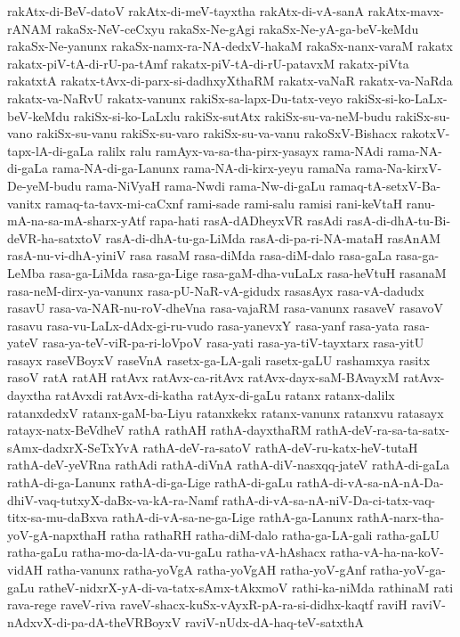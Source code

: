 {rakAtx-di-BeV-datoV
rakAtx-di-meV-tayxtha
rakAtx-di-vA-sanA
rakAtx-mavx-rANAM
rakaSx-NeV-ceCxyu
rakaSx-Ne-gAgi
rakaSx-Ne-yA-ga-beV-keMdu
rakaSx-Ne-yanunx
rakaSx-namx-ra-NA-dedxV-hakaM
rakaSx-nanx-varaM
rakatx
rakatx-piV-tA-di-rU-pa-tAmf
rakatx-piV-tA-di-rU-patavxM
rakatx-piVta
rakatxtA
rakatx-tAvx-di-parx-si-dadhxyXthaRM
rakatx-vaNaR
rakatx-va-NaRda
rakatx-va-NaRvU
rakatx-vanunx
rakiSx-sa-lapx-Du-tatx-veyo
rakiSx-si-ko-LaLx-beV-keMdu
rakiSx-si-ko-LaLxlu
rakiSx-sutAtx
rakiSx-su-va-neM-budu
rakiSx-su-vano
rakiSx-su-vanu
rakiSx-su-varo
rakiSx-su-va-vanu
rakoSxV-Bishacx
rakotxV-tapx-lA-di-gaLa
ralilx
ralu
ramAyx-va-sa-tha-pirx-yasayx
rama-NAdi
rama-NA-di-gaLa
rama-NA-di-ga-Lanunx
rama-NA-di-kirx-yeyu
ramaNa
rama-Na-kirxV-De-yeM-budu
rama-NiVyaH
rama-Nwdi
rama-Nw-di-gaLu
ramaq-tA-setxV-Ba-vanitx
ramaq-ta-tavx-mi-caCxnf
rami-sade
rami-salu
ramisi
rani-keVtaH
ranu-mA-na-sa-mA-sharx-yAtf
rapa-hati
rasA-dADheyxVR
rasAdi
rasA-di-dhA-tu-Bi-deVR-ha-satxtoV
rasA-di-dhA-tu-ga-LiMda
rasA-di-pa-ri-NA-mataH
rasAnAM
rasA-nu-vi-dhA-yiniV
rasa
rasaM
rasa-diMda
rasa-diM-dalo
rasa-gaLa
rasa-ga-LeMba
rasa-ga-LiMda
rasa-ga-Lige
rasa-gaM-dha-vuLaLx
rasa-heVtuH
rasanaM
rasa-neM-dirx-ya-vanunx
rasa-pU-NaR-vA-gidudx
rasasAyx
rasa-vA-dadudx
rasavU
rasa-va-NAR-nu-roV-dheVna
rasa-vajaRM
rasa-vanunx
rasaveV
rasavoV
rasavu
rasa-vu-LaLx-dAdx-gi-ru-vudo
rasa-yanevxY
rasa-yanf
rasa-yata
rasa-yateV
rasa-ya-teV-viR-pa-ri-loVpoV
rasa-yati
rasa-ya-tiV-tayxtarx
rasa-yitU
rasayx
raseVBoyxV
raseVnA
rasetx-ga-LA-gali
rasetx-gaLU
rashamxya
rasitx
rasoV
ratA
ratAH
ratAvx
ratAvx-ca-ritAvx
ratAvx-dayx-saM-BAvayxM
ratAvx-dayxtha
ratAvxdi
ratAvx-di-katha
ratAyx-di-gaLu
ratanx
ratanx-dalilx
ratanxdedxV
ratanx-gaM-ba-Liyu
ratanxkekx
ratanx-vanunx
ratanxvu
ratasayx
ratayx-natx-BeVdheV
rathA
rathAH
rathA-dayxthaRM
rathA-deV-ra-sa-ta-satx-sAmx-dadxrX-SeTxYvA
rathA-deV-ra-satoV
rathA-deV-ru-katx-heV-tutaH
rathA-deV-yeVRna
rathAdi
rathA-diVnA
rathA-diV-nasxqq-jateV
rathA-di-gaLa
rathA-di-ga-Lanunx
rathA-di-ga-Lige
rathA-di-gaLu
rathA-di-vA-sa-nA-nA-Da-dhiV-vaq-tutxyX-daBx-va-kA-ra-Namf
rathA-di-vA-sa-nA-niV-Da-ci-tatx-vaq-titx-sa-mu-daBxva
rathA-di-vA-sa-ne-ga-Lige
rathA-ga-Lanunx
rathA-narx-tha-yoV-gA-napxthaH
ratha
rathaRH
ratha-diM-dalo
ratha-ga-LA-gali
ratha-gaLU
ratha-gaLu
ratha-mo-da-lA-da-vu-gaLu
ratha-vA-hAshacx
ratha-vA-ha-na-koV-vidAH
ratha-vanunx
ratha-yoVgA
ratha-yoVgAH
ratha-yoV-gAnf
ratha-yoV-ga-gaLu
ratheV-nidxrX-yA-di-va-tatx-sAmx-tAkxmoV
rathi-ka-niMda
rathinaM
rati
rava-rege
raveV-riva
raveV-shacx-kuSx-vAyxR-pA-ra-si-didhx-kaqtf
raviH
raviV-nAdxvX-di-pa-dA-theVRBoyxV
raviV-nUdx-dA-haq-teV-satxthA
}
